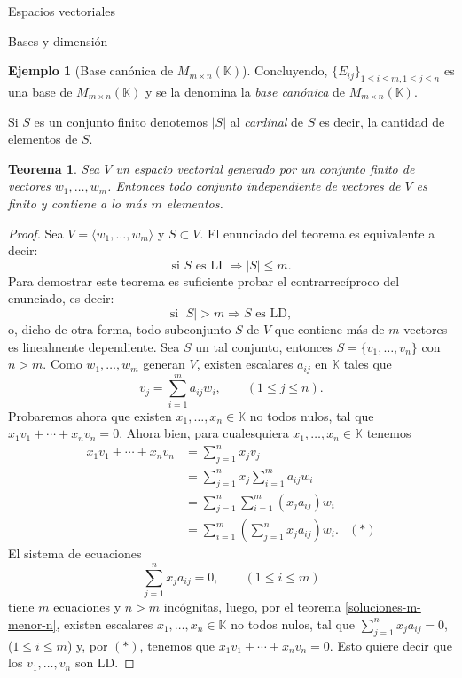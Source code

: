 \documentclass[a4paper,12pt,twoside,spanish,reqno]{amsbook}
\newtheorem{teorema}{Teorema}[section]
\theoremstyle{definition}
\newtheorem{ejemplo}{Ejemplo}[section]
\theoremstyle{remark}
\newcommand{\la}{\langle}
\newcommand{\ra}{\rangle}
\newcommand{\K}{\mathbb K}
\begin{document}
\begin{chapter}{Espacios vectoriales}
\begin{section}{Bases y dimensión}
\begin{ejemplo}[{\sc Base canónica de $M_{m \times n}(\K)$}]
	Concluyendo,  $\{E_{ij} \}_{1 \le i \le m, 1\le j \le n}$ es una base de  $M_{m \times n}(\K)$ y se la denomina la \textit{base canónica} de  $M_{m \times n}(\K)$.
\end{ejemplo}



Si $S$ es un conjunto finito denotemos $|S|$  al \textit{cardinal} de  $S$ es decir, la cantidad de elementos de $S$. 

\begin{teorema}\label{indep-menorigual-gen}
	Sea $V$ un espacio vectorial generado por un conjunto finito de vectores $w_1,\ldots,w_m$. Entonces todo conjunto independiente de vectores de $V$ es finito y  contiene a lo más $m$ elementos. 
\end{teorema}
\begin{proof} Sea $V = \la w_1,\ldots,w_m\ra$ y  $S \subset V$.   El  enunciado del teorema es equivalente a decir:
	$$
	\text{si }S \text{ es LI } \Rightarrow |S| \le m.
	$$
	Para demostrar este teorema es suficiente probar el contrarrecíproco del enunciado, es decir:
	$$
	\text{si }|S| > m \Rightarrow S \text{ es LD},
	$$
	o, dicho  de otra forma, todo subconjunto $S$ de $V$ que contiene más de $m$ vectores es linealmente dependiente. Sea $S$ un tal conjunto,  entonces $S = \{v_1,\ldots,v_n\}$ con $n >m$.  Como  $w_1,\ldots,w_m$ generan $V$, existen escalares $a_{ij}$ en $\K$ tales que
	\begin{equation*}
		v_j = \sum_{i=1}^{m}a_{ij}w_i, \qquad (1 \le j \le n).
	\end{equation*}
	Probaremos ahora que existen $x_1,\ldots,x_n \in \K$ no todos nulos, tal que $x_1v_1 + \cdots+x_nv_n =0$. Ahora bien, para cualesquiera $x_1,\ldots,x_n \in \K$ tenemos
	\begin{align*}
		x_1v_1 + \cdots+x_nv_n &= \sum_{j=1}^{n} x_jv_j& \\
		& = \sum_{j=1}^{n}x_j \sum_{i=1}^{m}a_{ij}w_i& \\
		& = \sum_{j=1}^{n} \sum_{i=1}^{m}(x_ja_{ij})w_i& \\ 
		& = \sum_{i=1}^{m}(\sum_{j=1}^{n} x_ja_{ij})w_i.&  (*)
	\end{align*}
	El sistema de ecuaciones
	\begin{equation*}
		\sum_{j=1}^{n} x_ja_{ij} = 0, \qquad (1 \le i \le m) 
	\end{equation*}
	tiene $m$ ecuaciones  y $n > m$ incógnitas, luego, por el teorema \ref{soluciones-m-menor-n}, existen escalares $x_1,\ldots,x_n \in \K$ no todos nulos, tal que $\sum_{j=1}^{n} x_ja_{ij} = 0$, ($1 \le i \le m$) y, por $(*)$, tenemos que  $x_1v_1 + \cdots+x_nv_n =0$. Esto quiere decir que los $v_1,\ldots,v_n$ son LD.
\end{proof}



\end{section}
\end{chapter}
\end{document}
